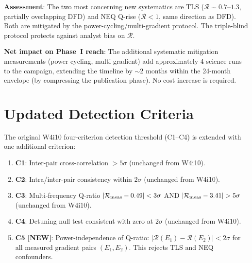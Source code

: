 \documentclass[11pt]{article}
\theoremstyle{definition}
\theoremstyle{remark}
\begin{document}
\textbf{Assessment}: The two most concerning new systematics are TLS
($\mathcal{R} \sim 0.7$--$1.3$, partially overlapping DFD) and NEQ
Q-rise ($\mathcal{R} < 1$, same direction as DFD). Both are mitigated
by the power-cycling/multi-gradient protocol. The triple-blind protocol
protects against analyst bias on $\mathcal{R}$.

\textbf{Net impact on Phase~I reach}: The additional systematic
mitigation measurements (power cycling, multi-gradient) add
approximately 4 science runs to the campaign, extending the timeline
by $\sim$2 months within the 24-month envelope (by compressing the
publication phase). No cost increase is required.


\part{Updated Detection Criteria}
\label{part:detection}

The original W4i10 four-criterion detection threshold (C1--C4) is
extended with one additional criterion:

\begin{tcolorbox}[colback=green!5!white, colframe=green!60!black,
  title=\textbf{UPDATED DETECTION CRITERIA (5$\sigma$ discovery)}]
\begin{enumerate}[label=\textbf{C\arabic*.}, itemsep=6pt]

\item \textbf{C1}: Inter-pair cross-correlation $> 5\sigma$
  (unchanged from W4i10).

\item \textbf{C2}: Intra/inter-pair consistency within $2\sigma$
  (unchanged from W4i10).

\item \textbf{C3}: Multi-frequency Q-ratio $|\mathcal{R}_{\rm meas}
  - 0.49| < 3\sigma$ AND $|\mathcal{R}_{\rm meas} - 3.41| > 5\sigma$
  (unchanged from W4i10).

\item \textbf{C4}: Detuning null test consistent with zero at $2\sigma$
  (unchanged from W4i10).

\item \textbf{C5 [NEW]}: Power-independence of Q-ratio:
  $|\mathcal{R}(E_1) - \mathcal{R}(E_2)| < 2\sigma$ for all
  measured gradient pairs $(E_1, E_2)$. This rejects TLS and NEQ
  confounders.

\end{enumerate}
\end{tcolorbox}
\end{document}
